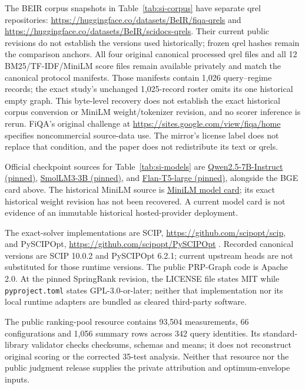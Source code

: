 \documentclass[pdflatex,sn-basic,Numbered]{sn-jnl}
\begin{document}
The BEIR corpus snapshots in Table~\ref{tab:si-corpus} have separate qrel repositories: \url{https://huggingface.co/datasets/BeIR/fiqa-qrels} and \url{https://huggingface.co/datasets/BeIR/scidocs-qrels}. Their current public revisions do not establish the versions used historically; frozen qrel hashes remain the comparison anchors. All four original canonical processed qrel files and all 12 BM25/TF-IDF/MiniLM score files remain available privately and match the canonical protocol manifests. Those manifests contain 1,026 query--regime records; the exact study's unchanged 1,025-record roster omits its one historical empty graph. This byte-level recovery does not establish the exact historical corpus conversion or MiniLM weight/tokenizer revision, and no scorer inference is rerun. FiQA's original challenge at \url{https://sites.google.com/view/fiqa/home} specifies noncommercial source-data use. The mirror's license label does not replace that condition, and the paper does not redistribute its text or qrels.

Official checkpoint sources for Table~\ref{tab:si-models} are \href{https://huggingface.co/Qwen/Qwen2.5-7B-Instruct/tree/acbd96531cda22292a3ceaa67e984955d3965282}{Qwen2.5-7B-Instruct (pinned)}, \href{https://huggingface.co/HuggingFaceTB/SmolLM3-3B/tree/a07cc9a04f16550a088caea529712d1d335b0ac1}{SmolLM3-3B (pinned)}, and \href{https://huggingface.co/google/flan-t5-large/tree/0613663d0d48ea86ba8cb3d7a44f0f65dc596a2a}{Flan-T5-large (pinned)}, alongside the BGE card above. The historical MiniLM source is \href{https://huggingface.co/sentence-transformers/all-MiniLM-L6-v2}{MiniLM model card}; its exact historical weight revision has not been recovered. A current model card is not evidence of an immutable historical hosted-provider deployment.

The exact-solver implementations are SCIP, \url{https://github.com/scipopt/scip}, and PySCIPOpt, \url{https://github.com/scipopt/PySCIPOpt} \cite{achterberg2009scip,maher2016pyscipopt}. Recorded canonical versions are SCIP 10.0.2 and PySCIPOpt 6.2.1; current upstream heads are not substituted for those runtime versions. The public PRP-Graph code is Apache 2.0. At the pinned SpringRank revision, the LICENSE file states MIT while \nolinkurl{pyproject.toml} states GPL-3.0-or-later; neither that implementation nor its local runtime adapters are bundled as cleared third-party software.

The public ranking-pool resource contains 93,504 measurements, 66 configurations and 1,056 summary rows across 342 query identities. Its standard-library validator checks checksums, schemas and means; it does not reconstruct original scoring or the corrected 35-test analysis. Neither that resource nor the public judgment release supplies the private attribution and optimum-envelope inputs.


\end{document}
